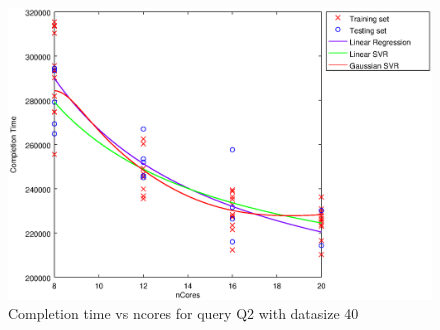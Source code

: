
\begin {figure}[hbtp]
\centering
\includegraphics[width=\textwidth]{output/Q2_40_ONLY_1_OVER_NCORES/plot_Q2_40_bestmodels.eps}
\caption{Completion time vs ncores for query Q2 with datasize 40}
\label{fig:all_linear_Q2_40}
\end {figure}
